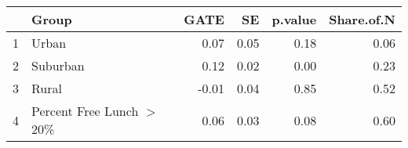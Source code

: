 \begin{tabular}{rlrrrr}
  \hline
 & Group & GATE & SE & p.value & Share.of.N \\ 
  \hline
1 & Urban & 0.07 & 0.05 & 0.18 & 0.06 \\ 
  2 & Suburban & 0.12 & 0.02 & 0.00 & 0.23 \\ 
  3 & Rural & -0.01 & 0.04 & 0.85 & 0.52 \\ 
  4 & Percent Free Lunch $>$ 20\% & 0.06 & 0.03 & 0.08 & 0.60 \\ 
   \hline
\end{tabular}
